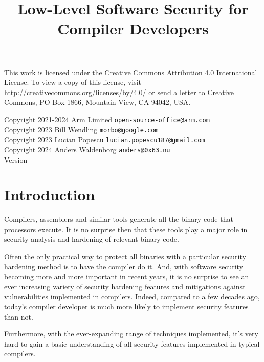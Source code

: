 \documentclass[
  a4paper,
]{report}
\title{Low-Level Software Security for Compiler Developers}
\author{}
\date{}
\begin{document}
\maketitle

\clearpage

\vspace*{\fill}
This work is licensed under the Creative Commons Attribution 4.0 International
License. To view a copy of this license, visit
http://creativecommons.org/licenses/by/4.0/ or send a letter to Creative
Commons, PO Box 1866, Mountain View, CA 94042, USA.

  Copyright 2021-2024 Arm Limited
\href{mailto:open-source-office@arm.com}{\nolinkurl{open-source-office@arm.com}}\\
  Copyright 2023 Bill Wendling
\href{mailto:morbo@google.com}{\nolinkurl{morbo@google.com}}\\
  Copyright 2023 Lucian Popescu
\href{mailto:lucian.popescu187@gmail.com}{\nolinkurl{lucian.popescu187@gmail.com}}\\
  Copyright 2024 Anders Waldenborg
\href{mailto:anders@0x63.nu}{\nolinkurl{anders@0x63.nu}}\\

Version 
\clearpage

{
\hypersetup{linkcolor=}
\setcounter{tocdepth}{2}
\tableofcontents
}
\chapter{Introduction}\label{introduction}

Compilers, assemblers and similar tools generate all the binary code
that processors execute. It is no surprise then that these tools play a
major role in security analysis and hardening of relevant binary code.

Often the only practical way to protect all binaries with a particular
security hardening method is to have the compiler do it. And, with
software security becoming more and more important in recent years, it
is no surprise to see an ever increasing variety of security hardening
features and mitigations against vulnerabilities implemented in
compilers. Indeed, compared to a few decades ago, today's compiler
developer is much more likely to implement security features than not.

Furthermore, with the ever-expanding range of techniques implemented,
it's very hard to gain a basic understanding of all security features
implemented in typical compilers.
\end{document}
